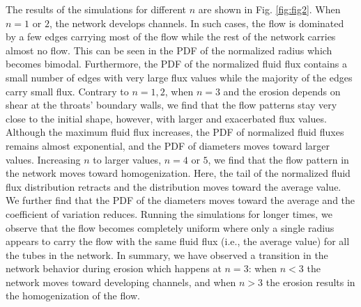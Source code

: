 \documentclass[%
 reprint,
 amsmath,amssymb,
 aps,
]{revtex4-1}
\begin{document}
The results of the simulations for different $n$ are shown in Fig. \ref{fig:fig2}. When $n=1$ or $2$,  the network develops channels. In such cases, the flow is dominated by a few edges carrying most of the flow while the rest of the network carries almost no flow. This can be seen in the PDF of the normalized radius which becomes bimodal. Furthermore, the PDF of the normalized fluid flux contains a small number of edges with very large flux values while the majority of the edges carry small flux. Contrary to $n=1,2$, when $n=3$ and the erosion depends on shear at the throats' boundary walls, we find that the flow patterns stay very close to the initial shape, however, with larger and exacerbated flux values. Although the maximum fluid flux increases, the PDF of normalized fluid fluxes remains almost exponential, and the PDF of diameters moves toward larger values. Increasing $n$ to larger values, $n=4$ or $5$, we find that the flow pattern in the network moves toward homogenization. Here, the tail of the normalized fluid flux distribution retracts and the distribution moves toward the average value. We further find that the PDF of the diameters moves toward the average and the coefficient of variation reduces. Running the simulations for longer times, we observe that the flow becomes completely uniform where only a single radius appears to carry the flow with the same fluid flux (i.e., the average value) for all the tubes in the network. In summary, we have observed a transition in the network behavior during erosion which happens at $n=3$: when $n<3$ the network moves toward developing channels, and when $n>3$ the erosion results in the homogenization of the flow.
\end{document}
